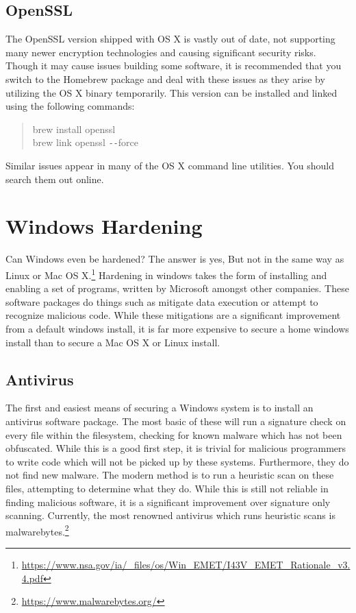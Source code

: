 \documentclass[a4paper,11pt]{report}
\begin{document}
			\subsection{OpenSSL}
				The OpenSSL version shipped with OS X is vastly out of date, not supporting many newer encryption technologies and causing significant security risks. 
				Though it may cause issues building some software, it is recommended that you switch to the Homebrew package and deal with these issues as they arise by utilizing the OS X binary temporarily.
				This version can be installed and linked using the following commands:
				\begin{quote}
					brew install openssl \\
					brew link openssl \verb+--+force
				\end{quote}
				Similar issues appear in many of the OS X command line utilities. 
				You should search them out online. 
	\section{Windows Hardening}
		Can Windows even be hardened? The answer is yes, But not in the same way as Linux or Mac OS X.\footnote{\url{https://www.nsa.gov/ia/\_files/os/Win\_EMET/I43V\_EMET\_Rationale\_v3.4.pdf}}
		Hardening in windows takes the form of installing and enabling a set of programs, written by Microsoft amongst other companies. 
		These software packages do things such as mitigate data execution or attempt to recognize malicious code. 
		While these mitigations are a significant improvement from a default windows install, it is far more expensive to secure a home windows install than to secure a Mac OS X or Linux install. 
		\subsection{Antivirus}
			The first and easiest means of securing a Windows system is to install an antivirus software package. 
			The most basic of these will run a signature check on every file within the filesystem, checking for known malware which has not been obfuscated. 
			While this is a good first step, it is trivial for malicious programmers to write code which will not be picked up by these systems. 
			Furthermore, they do not find new malware.
			The modern method is to run a heuristic scan on these files, attempting to determine what they do. 
			While this is still not reliable in finding malicious software, it is a significant improvement over signature only scanning. 
			Currently, the most renowned antivirus which runs heuristic scans is malwarebytes.\footnote{\url{https://www.malwarebytes.org/}}
\end{document}
